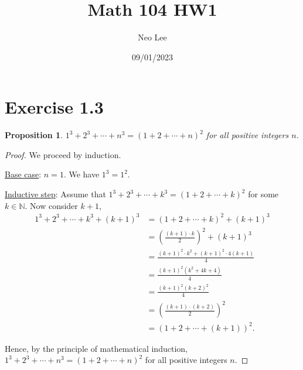 \documentclass{article}
\title{Math 104 HW1}
\author{Neo Lee}
\date{09/01/2023}
\newtheorem{proposition}[thm]{Proposition}
\begin{document}
 

\maketitle 

\section*{Exercise 1.3}
\begin{proposition}
    $1^3 + 2^3 + \cdots + n^3 = (1+2+\cdots + n)^2$ for all positive integers $n$.
\end{proposition}    
\begin{proof}
    We proceed by induction.

    \underline{Base case}: $n=1$. We have $1^3 = 1^2$.

    \underline{Inductive step}: Assume that $1^3 + 2^3 + \cdots + k^3 = (1+2+\cdots +k)^2$ for 
    some $k \in \mathbb{N}$. Now consider $k+1$,
    \begin{align*}
        1^3 + 2^3 + \cdots + k^3 + (k+1)^3 & = (1+2+\cdots +k)^2 + (k+1)^3 \\
        & = \left(\frac{(k+1)\cdot k}{2}\right)^2 + (k+1)^3 \\ 
        & = \frac{(k+1)^2\cdot k^2 + (k+1)^2 \cdot 4(k+1)}{4} \\
        & = \frac{(k+1)^2(k^2 + 4k + 4)}{4} \\
        & = \frac{(k+1)^2(k+2)^2}{4} \\
        & = \left(\frac{(k+1)\cdot (k+2)}{2}\right)^2 \\
        & = (1+2+\cdots +(k+1))^2.
    \end{align*}

    Hence, by the principle of mathematical induction, $1^3 + 2^3 + \cdots + n^3 = 
    (1+2+\cdots + n)^2$ for all positive integers $n$.
\end{proof}
\bigbreak
\end{document}
